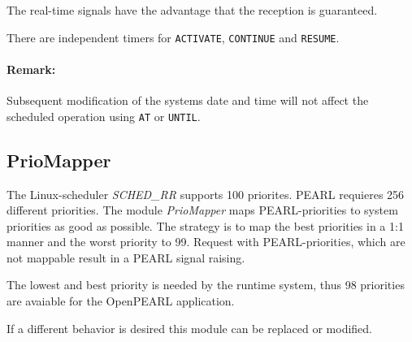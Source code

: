 The real-time signals have the advantage that the reception is guaranteed.

There are independent timers for \verb|ACTIVATE|, \verb|CONTINUE| 
and \verb|RESUME|.

\paragraph{Remark:} Subsequent modification of the systems date and time 
will not affect the scheduled operation using \verb|AT| or \verb|UNTIL|.


\subsection{PrioMapper}
The Linux-scheduler {\em SCHED\_RR} supports 100 priorites. PEARL requieres 
256 different priorities.
The module {\em PrioMapper} maps PEARL-priorities to system priorities as good
as possible. The strategy is to map the best priorities in a 1:1 manner and the
worst priority to 99. 
Request with PEARL-priorities, which are not mappable result in a PEARL
signal raising.

The lowest and best priority is needed by the runtime system, thus 98 
priorities are avaiable for the OpenPEARL application.

If a different behavior is desired this module can be replaced or modified.


